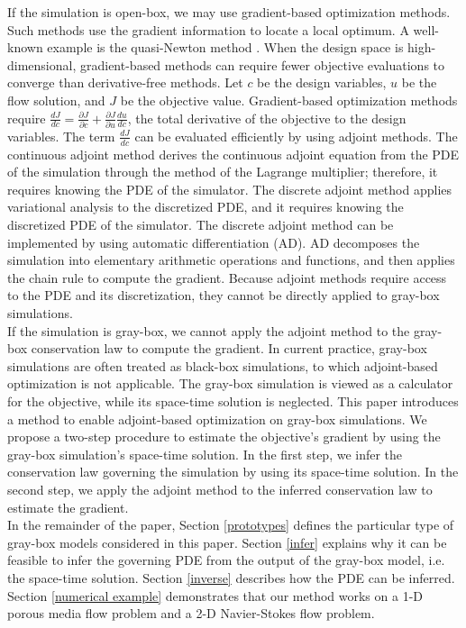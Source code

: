 \documentclass[a4paper,onecolumn]{article}
\theoremstyle{remark}
\begin{document}
\indent If the simulation is open-box, we may use gradient-based optimization methods.
Such methods use the gradient information to locate a local optimum.
A well-known example is the quasi-Newton method \cite{quasiNewton}. 
When the design space is high-dimensional, gradient-based methods can require fewer
objective evaluations to converge than derivative-free methods.
Let $c$ be the design variables, $u$ be the flow solution, and $J$ be the objective value.
Gradient-based optimization methods require $\frac{d J}{d c} = \frac{\partial J}{\partial c} + \frac{\partial J}{\partial u}
\frac{d u}{d c}$, the total derivative of the objective to the design variables. 
The term $\frac{dJ}{dc}$ can be evaluated efficiently by using adjoint methods.
The continuous adjoint method derives the continuous adjoint equation from the PDE of the simulation through the
method of the Lagrange multiplier; therefore, it requires knowing the PDE of the simulator. 
The discrete adjoint method applies variational analysis to the discretized PDE, and it requires knowing the
discretized PDE of the simulator.
The discrete adjoint method can be implemented by using automatic differentiation (AD).
AD decomposes the simulation into elementary arithmetic operations and functions, and
then applies the chain
rule to compute the gradient.
Because adjoint methods require access to the PDE and its discretization, they cannot be directly
applied to gray-box simulations.\\

\indent If the simulation is gray-box, we cannot apply the adjoint method to the gray-box conservation law
to compute the gradient. In current practice, gray-box simulations are often treated as black-box simulations, to which 
adjoint-based optimization is not applicable.
The gray-box simulation is viewed as a calculator for the objective, while its space-time solution is neglected.
This paper introduces a method to enable adjoint-based optimization on gray-box simulations. We propose
a two-step procedure to estimate the objective's gradient by using the gray-box simulation's space-time solution.
In the first step, we infer the conservation law governing the simulation by using its space-time solution. In
the second step, we apply the adjoint method to the inferred conservation law to estimate the gradient.\\


\indent In the remainder of the paper, Section \ref{prototypes} defines the particular type of
gray-box models considered in this paper. Section \ref{infer} explains why it can be feasible to
infer the governing PDE from the output of the gray-box model, i.e. the space-time solution.
Section \ref{inverse} describes how the PDE can be inferred. 
Section \ref{numerical example} demonstrates that our method works on a 1-D porous media flow problem and
a 2-D Navier-Stokes flow problem.
\end{document}
